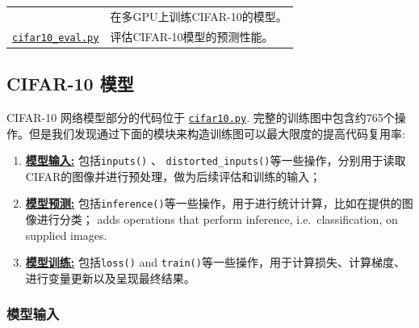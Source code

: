 \begin{longtable}[c]{@{}ll@{}}
\begin{minipage}[t]{0.05\columnwidth}
\strut\end{minipage} &
\begin{minipage}[t]{0.05\columnwidth}\raggedright\strut
在多GPU上训练CIFAR-10的模型。
\strut\end{minipage}\tabularnewline
\begin{minipage}[t]{0.05\columnwidth}\raggedright\strut
\href{https://tensorflow.googlesource.com/tensorflow/+/master/tensorflow/models/image/cifar10/cifar10_eval.py}{\texttt{cifar10\_eval.py}}
\strut\end{minipage} &
\begin{minipage}[t]{0.05\columnwidth}\raggedright\strut
评估CIFAR-10模型的预测性能。
\strut\end{minipage}\tabularnewline
\bottomrule
\end{longtable}

\subsection{CIFAR-10 模型 }\label{cifar-10-ux6a21ux578b}

CIFAR-10 网络模型部分的代码位于
\href{https://tensorflow.googlesource.com/tensorflow/+/master/tensorflow/models/image/cifar10/cifar10.py}{\texttt{cifar10.py}}.
完整的训练图中包含约765个操作。但是我们发现通过下面的模块来构造训练图可以最大限度的提高代码复用率:

\begin{enumerate}
\def\labelenumi{\arabic{enumi}.}
\tightlist
\item
  \protect\hyperlink{model-inputs}{\textbf{模型输入:}}
  包括\texttt{inputs()} 、
  \texttt{distorted\_inputs()}等一些操作，分别用于读取CIFAR的图像并进行预处理，做为后续评估和训练的输入；
\item
  \protect\hyperlink{model-prediction}{\textbf{模型预测:}}
  包括\texttt{inference()}等一些操作，用于进行统计计算，比如在提供的图像进行分类；
  adds operations that perform inference, i.e.~classification, on
  supplied images.
\item
  \protect\hyperlink{model-training}{\textbf{模型训练:}}
  包括\texttt{loss()} and
  \texttt{train()}等一些操作，用于计算损失、计算梯度、进行变量更新以及呈现最终结果。
\end{enumerate}

\subsubsection{模型输入 }\label{ux6a21ux578bux8f93ux5165}

